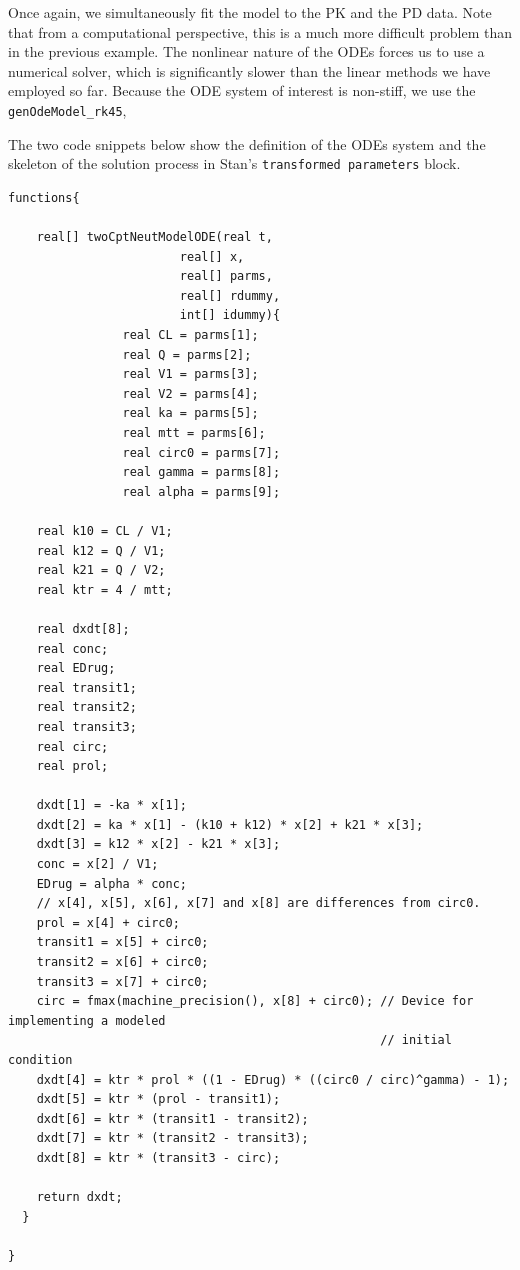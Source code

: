 \documentclass[11pt, reqno, oneside]{amsbook}
\numberwithin{equation}{chapter}
\numberwithin{figure}{chapter}
\numberwithin{table}{chapter}
\theoremstyle{remark}
\begin{document}
Once again, we simultaneously fit the model to the PK and the PD
data. Note that from a computational perspective, this is a much more
difficult problem than in the previous
example. The nonlinear nature of the ODEs forces us to use a numerical
solver, which is significantly slower than the linear methods we have
employed so far. Because the ODE system of interest is non-stiff, we
use the \texttt{genOdeModel\_rk45}, 

The two code snippets below show the definition of the ODEs
system and the skeleton of the solution process in Stan's
\texttt{transformed parameters} block.
\begin{verbatim}
functions{

    real[] twoCptNeutModelODE(real t,
                        real[] x,
                        real[] parms,
                        real[] rdummy,
                        int[] idummy){
                real CL = parms[1];
                real Q = parms[2];
                real V1 = parms[3];
                real V2 = parms[4];
                real ka = parms[5];
                real mtt = parms[6];
                real circ0 = parms[7];
                real gamma = parms[8];
                real alpha = parms[9];

    real k10 = CL / V1;
    real k12 = Q / V1;
    real k21 = Q / V2;
    real ktr = 4 / mtt;

    real dxdt[8];
    real conc;
    real EDrug;
    real transit1;
    real transit2;
    real transit3;
    real circ;
    real prol;

    dxdt[1] = -ka * x[1];
    dxdt[2] = ka * x[1] - (k10 + k12) * x[2] + k21 * x[3];
    dxdt[3] = k12 * x[2] - k21 * x[3];
    conc = x[2] / V1;
    EDrug = alpha * conc;
    // x[4], x[5], x[6], x[7] and x[8] are differences from circ0.
    prol = x[4] + circ0;
    transit1 = x[5] + circ0;
    transit2 = x[6] + circ0;
    transit3 = x[7] + circ0;
    circ = fmax(machine_precision(), x[8] + circ0); // Device for implementing a modeled 
                                                    // initial condition
    dxdt[4] = ktr * prol * ((1 - EDrug) * ((circ0 / circ)^gamma) - 1);
    dxdt[5] = ktr * (prol - transit1);
    dxdt[6] = ktr * (transit1 - transit2);
    dxdt[7] = ktr * (transit2 - transit3);
    dxdt[8] = ktr * (transit3 - circ);

    return dxdt;
  }

}
\end{verbatim}
\end{document}
